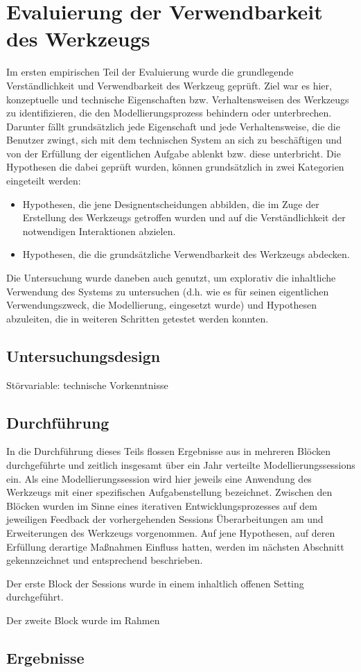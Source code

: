 \chapter{Evaluierung der Verwendbarkeit des Werkzeugs} %
\label{cha:eval_werkzeug}

Im ersten empirischen Teil der Evaluierung wurde die grundlegende Verständlichkeit und Verwendbarkeit des Werkzeug geprüft. Ziel war es hier, konzeptuelle und technische Eigenschaften bzw. Verhaltensweisen des Werkzeugs zu identifizieren, die den Modellierungsprozess behindern oder unterbrechen. Darunter fällt grundsätzlich jede Eigenschaft und jede Verhaltensweise, die die Benutzer zwingt, sich mit dem technischen System an sich zu beschäftigen und von der Erfüllung der eigentlichen Aufgabe ablenkt bzw. diese unterbricht. Die Hypothesen die dabei geprüft wurden, können grundsätzlich in zwei Kategorien eingeteilt werden:
\begin{itemize}
 \item Hypothesen, die jene Designentscheidungen abbilden, die im Zuge der Erstellung des Werkzeugs getroffen wurden und auf die Verständlichkeit der notwendigen Interaktionen abzielen.
 \item Hypothesen, die die grundsätzliche Verwendbarkeit des Werkzeugs abdecken.
\end{itemize}

Die Untersuchung wurde daneben auch genutzt, um explorativ die inhaltliche Verwendung des Systems zu untersuchen (d.h. wie es für seinen eigentlichen Verwendungszweck, die Modellierung, eingesetzt wurde) und Hypothesen abzuleiten, die in weiteren Schritten getestet werden konnten.

\section{Untersuchungsdesign}

Störvariable: technische Vorkenntnisse 

\section{Durchführung}

In die Durchführung dieses Teils flossen Ergebnisse aus in mehreren Blöcken durchgeführte und zeitlich insgesamt über ein Jahr verteilte Modellierungssessions ein. Als eine Modellierungssession wird hier jeweils eine Anwendung des Werkzeugs mit einer spezifischen Aufgabenstellung bezeichnet. Zwischen den Blöcken wurden im Sinne eines iterativen Entwicklungsprozesses auf dem jeweiligen Feedback der vorhergehenden Sessions Überarbeitungen am und Erweiterungen des Werkzeugs vorgenommen. Auf jene Hypothesen, auf deren Erfüllung derartige Maßnahmen Einfluss hatten, werden im nächsten Abschnitt gekennzeichnet und entsprechend beschrieben.

Der erste Block der Sessions wurde in einem inhaltlich offenen Setting durchgeführt.

Der zweite Block wurde im Rahmen 

\section{Ergebnisse}


